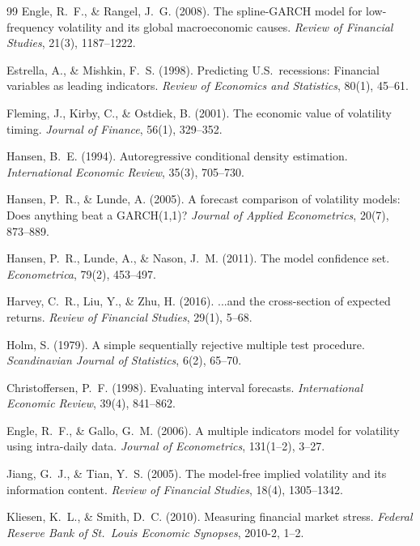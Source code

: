 \documentclass[12pt,a4paper]{article}
\begin{document}
\begin{thebibliography}{99}
Engle, R.~F., \& Rangel, J.~G. (2008). The spline-GARCH model for low-frequency volatility and its global macroeconomic causes. \textit{Review of Financial Studies}, 21(3), 1187--1222.

Estrella, A., \& Mishkin, F.~S. (1998). Predicting U.S.\ recessions: Financial variables as leading indicators. \textit{Review of Economics and Statistics}, 80(1), 45--61.

Fleming, J., Kirby, C., \& Ostdiek, B. (2001). The economic value of volatility timing. \textit{Journal of Finance}, 56(1), 329--352.

Hansen, B.~E. (1994). Autoregressive conditional density estimation. \textit{International Economic Review}, 35(3), 705--730.

Hansen, P.~R., \& Lunde, A. (2005). A forecast comparison of volatility models: Does anything beat a GARCH(1,1)? \textit{Journal of Applied Econometrics}, 20(7), 873--889.

Hansen, P.~R., Lunde, A., \& Nason, J.~M. (2011). The model confidence set. \textit{Econometrica}, 79(2), 453--497.

Harvey, C.~R., Liu, Y., \& Zhu, H. (2016). ...and the cross-section of expected returns. \textit{Review of Financial Studies}, 29(1), 5--68.

Holm, S. (1979). A simple sequentially rejective multiple test procedure. \textit{Scandinavian Journal of Statistics}, 6(2), 65--70.

Christoffersen, P.~F. (1998). Evaluating interval forecasts. \textit{International Economic Review}, 39(4), 841--862.

Engle, R.~F., \& Gallo, G.~M. (2006). A multiple indicators model for volatility using intra-daily data. \textit{Journal of Econometrics}, 131(1--2), 3--27.

Jiang, G.~J., \& Tian, Y.~S. (2005). The model-free implied volatility and its information content. \textit{Review of Financial Studies}, 18(4), 1305--1342.

Kliesen, K.~L., \& Smith, D.~C. (2010). Measuring financial market stress. \textit{Federal Reserve Bank of St.\ Louis Economic Synopses}, 2010-2, 1--2.


\end{thebibliography}
\end{document}
